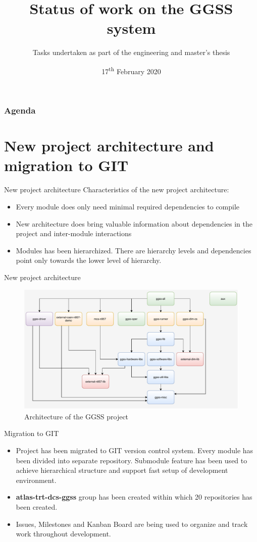 \documentclass[10pt]{beamer}
\title{Status of work on the GGSS system}
\subtitle{\normalsize{Tasks undertaken as part of the engineering and master's thesis}}
\date{17\textsuperscript{th} February 2020}
\author{\normalsize{Arkadiusz Kasprzak \newline \and Jarosław Cierpich \newline \and Grzegorz Podsiadło \newline \newline \and Supervisor: Bartosz Mindur}}
\begin{document}
\titleframe[en]

\begin{frame}
\frametitle{Agenda}
\tableofcontents
\end{frame}

\section {New project architecture and migration to GIT}

\begin{frame}{New project architecture}
Characteristics of the new project architecture:
\begin{itemize}
	\item Every module does only need minimal required dependencies to compile
	\item New architecture does bring valuable information about dependencies in the project and inter-module interactions
	\item Modules has been hierarchized. There are hierarchy levels and dependencies point only towards the lower level of hierarchy.
\end{itemize}
\end{frame}

\begin{frame}{New project architecture}
\begin{figure}
\centering
\includegraphics[width=\linewidth]{resources/topLevelArchitecture}
\caption{Architecture of the GGSS project}
\end{figure}
\end{frame}


\begin{frame}{Migration to GIT}
\begin{itemize}
	\item Project has been migrated to GIT version control system. Every module has been divided into separate repository. Submodule feature has been used to achieve hierarchical structure and support fast setup of development environment.
	\item \textbf{atlas-trt-dcs-ggss} group has been created within which 20 repositories has been created.
	\item Issues, Milestones and Kanban Board are being used to organize and track work throughout development.
\end{itemize}
\end{frame}
\end{document}
